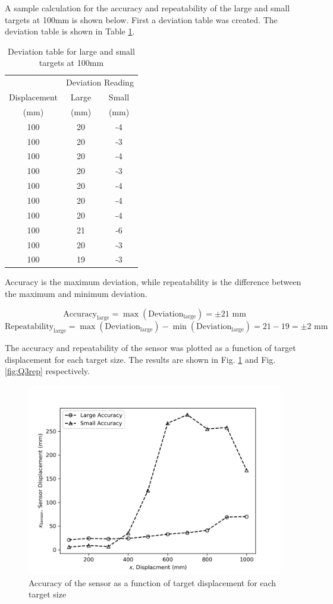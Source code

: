 A sample calculation for the accuracy and repeatability of the large and small targets at 100mm is shown below. First a deviation table was created. 
The deviation table is shown in Table \ref{tab:Q3a-deviation}.

\begin{table}[h]
    \centering
    \caption{Deviation table for large and small targets at 100mm}
    \label{tab:Q3a-deviation}
    \begin{tabular}{ccc}
        \hline
        & \multicolumn{2}{c}{Deviation Reading} \\
        \cline{2-3}
        Displacement & Large & Small \\
        (mm) & (mm) & (mm) \\
        \midrule
        100 & 20 & -4 \\
        100 & 20 & -3 \\
        100 & 20 & -4 \\
        100 & 20 & -3 \\
        100 & 20 & -4 \\
        100 & 20 & -4 \\
        100 & 20 & -4 \\
        100 & 21 & -6 \\
        100 & 20 & -3 \\
        100 & 19 & -3 \\
        \hline
    \end{tabular}
\end{table}

Accuracy is the maximum deviation, while repeatability is the difference between the maximum and minimum deviation.

\[
    \boxed{\text{Accuracy}_\text{large} = \max(\text{Deviation}_\text{large}) = \pm 21 \text{ mm}}
\]
\[
    \boxed{\text{Repeatability}_\text{large} = \max(\text{Deviation}_\text{large}) - \min(\text{Deviation}_\text{large}) = 21 - 19 = \pm 2 \text{ mm}}
\]

\FloatBarrier
The accuracy and repeatability of the sensor was plotted as a function of target displacement for each target size. The results are shown in Fig. \ref{fig:Q3acc} 
and Fig. \ref{fig:Q3rep} respectively.
\begin{figure}[h]
    \centering
    \includegraphics[width=0.6\linewidth]{matplotlib/Q3acc.png}
    \caption{Accuracy of the sensor as a function of target displacement for each target size}
    \label{fig:Q3acc}
\end{figure}

